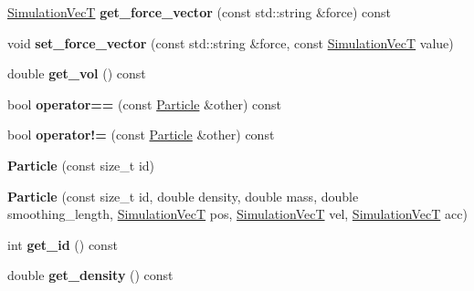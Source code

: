 \begin{DoxyCompactItemize}
\mbox{\label{classwash_1_1Particle_a9c6ec5d5a7407897ecca00549bd05c01}} 
\mbox{\hyperlink{classwash_1_1Vec}{Simulation\+VecT}} {\bfseries get\+\_\+force\+\_\+vector} (const std\+::string \&force) const
\item 
\mbox{\label{classwash_1_1Particle_a6960cdd169d1829a52e49cf835a8bfeb}} 
void {\bfseries set\+\_\+force\+\_\+vector} (const std\+::string \&force, const \mbox{\hyperlink{classwash_1_1Vec}{Simulation\+VecT}} value)
\item 
\mbox{\label{classwash_1_1Particle_ab16021a2c003de07dc0a418ffc3d5eb7}} 
double {\bfseries get\+\_\+vol} () const
\item 
\mbox{\label{classwash_1_1Particle_a32369e6edba4277ebc71917a37c2503d}} 
bool {\bfseries operator==} (const \mbox{\hyperlink{classwash_1_1Particle}{Particle}} \&other) const
\item 
\mbox{\label{classwash_1_1Particle_a32f1334a8a0b273a57355956d7e9fe63}} 
bool {\bfseries operator!=} (const \mbox{\hyperlink{classwash_1_1Particle}{Particle}} \&other) const
\item 
\mbox{\label{classwash_1_1Particle_a2e6821002f08011ccf1dd25b20c47b74}} 
{\bfseries Particle} (const size\+\_\+t id)
\item 
\mbox{\label{classwash_1_1Particle_acd5268c987c3bec7878d5ec0589b2ce7}} 
{\bfseries Particle} (const size\+\_\+t id, double density, double mass, double smoothing\+\_\+length, \mbox{\hyperlink{classwash_1_1Vec}{Simulation\+VecT}} pos, \mbox{\hyperlink{classwash_1_1Vec}{Simulation\+VecT}} vel, \mbox{\hyperlink{classwash_1_1Vec}{Simulation\+VecT}} acc)
\item 
\mbox{\label{classwash_1_1Particle_ad1a609f64405ebeace95a9e7c61f39bb}} 
int {\bfseries get\+\_\+id} () const
\item 
\mbox{\label{classwash_1_1Particle_a8c0ce3f48b189fd8550c3bfab17eec68}} 
double {\bfseries get\+\_\+density} () const
\item 

\end{DoxyCompactItemize}
